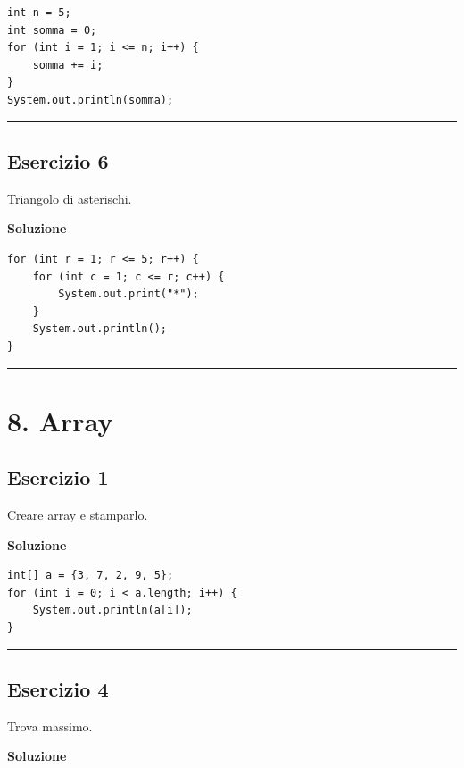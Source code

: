 \documentclass[
]{article}
\begin{document}
\begin{verbatim}
int n = 5;
int somma = 0;
for (int i = 1; i <= n; i++) {
    somma += i;
}
System.out.println(somma);
\end{verbatim}

\begin{center}\rule{0.5\linewidth}{0.5pt}\end{center}

\subsection{Esercizio 6}\label{esercizio-6-2}

Triangolo di asterischi.

\textbf{Soluzione}

\begin{verbatim}
for (int r = 1; r <= 5; r++) {
    for (int c = 1; c <= r; c++) {
        System.out.print("*");
    }
    System.out.println();
}
\end{verbatim}

\begin{center}\rule{0.5\linewidth}{0.5pt}\end{center}

\section{8. Array}\label{array}

\subsection{Esercizio 1}\label{esercizio-1-7}

Creare array e stamparlo.

\textbf{Soluzione}

\begin{verbatim}
int[] a = {3, 7, 2, 9, 5};
for (int i = 0; i < a.length; i++) {
    System.out.println(a[i]);
}
\end{verbatim}

\begin{center}\rule{0.5\linewidth}{0.5pt}\end{center}

\subsection{Esercizio 4}\label{esercizio-4-6}

Trova massimo.

\textbf{Soluzione}
\end{document}

